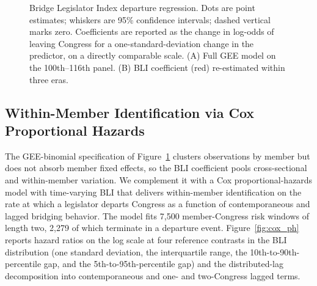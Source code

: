 \documentclass[12pt, a4paper]{article}
\begin{document}
\begin{figure}[H]
{
}
\caption{Bridge Legislator Index departure regression. Dots are point estimates; whiskers are 95\% confidence intervals; dashed vertical marks zero. Coefficients are reported as the change in log-odds of leaving Congress for a one-standard-deviation change in the predictor, on a directly comparable scale. (A) Full GEE model on the 100th--116th panel. (B) BLI coefficient (red) re-estimated within three eras.}
\label{fig:bli_regression}
\end{figure}

\subsection{Within-Member Identification via Cox Proportional Hazards}\label{subsec:cox_ph}

The GEE-binomial specification of Figure~\ref{fig:bli_regression} clusters observations by member but does not absorb member fixed effects, so the BLI coefficient pools cross-sectional and within-member variation. We complement it with a Cox proportional-hazards model with time-varying BLI \citep{boxsteffensmeier2004event} that delivers within-member identification on the rate at which a legislator departs Congress as a function of contemporaneous and lagged bridging behavior. The model fits 7{,}500 member-Congress risk windows of length two, 2{,}279 of which terminate in a departure event. Figure~\ref{fig:cox_ph} reports hazard ratios on the log scale at four reference contrasts in the BLI distribution (one standard deviation, the interquartile range, the 10th-to-90th-percentile gap, and the 5th-to-95th-percentile gap) and the distributed-lag decomposition into contemporaneous and one- and two-Congress lagged terms.
\end{document}
